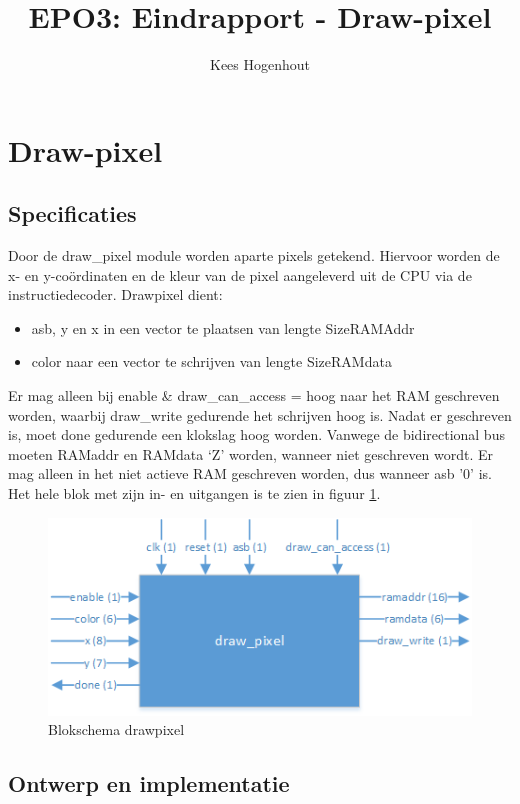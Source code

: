 \documentclass{scrartcl} %
\author{Kees Hogenhout}%
\title{EPO3: Eindrapport - Draw-pixel}
\begin{document}
\section{Draw-pixel} %
\label{sec:drawpixel} %

\subsection{Specificaties}
\label{ssec:specs_dp}
Door de draw\_pixel module worden aparte pixels getekend. Hiervoor worden de x- en y-coördinaten en de kleur van de pixel aangeleverd uit de CPU via de instructiedecoder.  Drawpixel dient: 
\begin{itemize}
\item asb, y en x in een vector te plaatsen van lengte SizeRAMAddr
\item color naar een vector te schrijven van lengte SizeRAMdata
\end{itemize}
  Er mag alleen bij enable \& draw\_can\_access = hoog naar het RAM geschreven worden, waarbij draw\_write gedurende het schrijven hoog is.  Nadat er geschreven is, moet done gedurende een klokslag hoog worden. Vanwege de bidirectional bus moeten RAMaddr en RAMdata `Z' worden, wanneer niet geschreven wordt. Er mag alleen in het niet actieve RAM geschreven worden, dus wanneer asb '0' is. Het hele blok met zijn in- en uitgangen is te zien in figuur  \ref{fig:dp_blokschema}. 
\begin{figure} [h!]
\centering
\includegraphics [width = \textwidth] {resource/dp_blokschema-rc}
\caption{Blokschema drawpixel}
\label{fig:dp_blokschema}
\end{figure}

\subsection{Ontwerp en implementatie}
\label{ssec:vhdl_dp}
\end{document}
